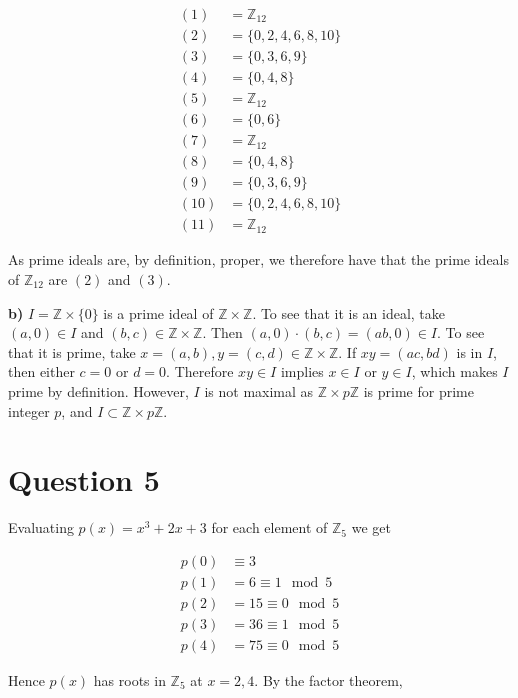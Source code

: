 \documentclass{article}
\newcommand\cart[2]{{#1}\times{#2}}
\begin{document}
\begin{align*}
    (1) &= \mathbb{Z}_{12}\\
    (2) &= \{0, 2, 4, 6, 8, 10\}\\
    (3) &= \{0, 3, 6, 9\}\\
    (4) &= \{0, 4, 8\}\\
    (5) &= \mathbb{Z}_{12}\\
    (6) &= \{0, 6\}\\
    (7) &= \mathbb{Z}_{12}\\
    (8) &= \{0, 4, 8\}\\
    (9) &= \{0, 3, 6, 9\}\\
    (10) &= \{0, 2, 4, 6, 8, 10\}\\
    (11) &= \mathbb{Z}_{12}
\end{align*}

As prime ideals are, by definition, proper, we therefore have that the prime
ideals of $\mathbb{Z}_{12}$ are $(2)$ and $(3)$.

\hfill\break
\textbf{b)} $I = \cart{\mathbb{Z}}{\{0\}}$ is a prime ideal of $\cart{\mathbb{Z}}{\mathbb{Z}}$.
To see that it is an ideal, take $(a, 0) \in I$ and $(b, c) \in \cart{\mathbb{Z}}{\mathbb{Z}}$.
Then $(a, 0)\cdot(b, c) = (ab, 0) \in I$. To see that it is prime, take
$x = (a, b), y = (c, d) \in \cart{\mathbb{Z}}{\mathbb{Z}}$. If
$xy = (ac, bd)$ is in $I$, then either $c = 0$ or $d = 0$. Therefore
$xy \in I$ implies $x \in I$ or $y \in I$, which makes $I$ prime by definition. However,
$I$ is not maximal as $\cart{\mathbb{Z}}{p\mathbb{Z}}$ is prime for prime integer $p$, and
$I \subset \cart{\mathbb{Z}}{p\mathbb{Z}}$.

\section*{Question 5}

Evaluating $p(x) = x^3 + 2x + 3$ for each element of $\mathbb{Z}_5$ we get

\begin{align*}
    p(0) &\equiv 3\\
    p(1) &= 6 \equiv 1\mod5\\
    p(2) &= 15 \equiv 0\mod5\\
    p(3) &= 36 \equiv 1\mod5\\
    p(4) &= 75 \equiv 0\mod5
\end{align*}

Hence $p(x)$ has roots in $\mathbb{Z}_5$ at $x = 2, 4$. By the factor theorem,
\end{document}
